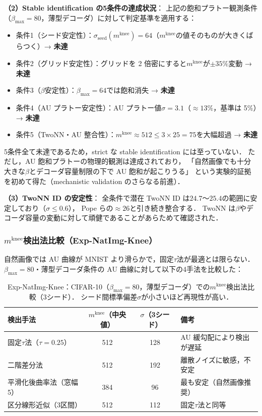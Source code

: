 \documentclass[11pt,a4paper]{jsarticle}
\newcommand{\mknee}{m^{\mathrm{knee}}}
\begin{document}
\textbf{（2）Stable identification の5条件の達成状況}：
上記の飽和プラトー観測条件（$\beta_{\max}=80$，薄型デコーダ）に対して判定基準を適用する：
\begin{itemize}
  \item 条件1（シード安定性）：$\sigma_\mathrm{seed}(\mknee) = 64$（$\mknee$の値そのものが大きくばらつく）→ \textbf{未達}
  \item 条件2（グリッド安定性）：グリッドを 2 倍密にすると$\mknee$が$\pm 35\%$変動 → \textbf{未達}
  \item 条件3（$\beta$安定性）：$\beta_{\max}=64$では飽和消失 → \textbf{未達}
  \item 条件4（AU プラトー安定性）：AU プラトー値$\sigma = 3.1$（$\approx 13\%$，基準は 5\%）→ \textbf{未達}
  \item 条件5（TwoNN・AU 整合性）：$\mknee \approx 512 \leq 3 \times 25 = 75$を大幅超過 → \textbf{未達}
\end{itemize}
5条件全て未達であるため，strict な stable identification には至っていない．
ただし，AU 飽和プラトーの物理的観測は達成されており，
「自然画像でも十分大きな$\beta$とデコーダ容量制限の下で AU 飽和が起こりうる」
という実験的証拠を初めて得た（mechanistic validation のさらなる前進）．

\textbf{（3）TwoNN ID の安定性}：
全条件で潜在 TwoNN ID は$24.7$〜$25.4$の範囲に安定しており（$\sigma \leq 0.6$），
Pope ら\cite{pope2021intrinsic}の$\approx26$と引き続き整合する．
TwoNN は$\beta$やデコーダ容量の変動に対して頑健であることがあらためて確認された．

\subsubsection*{$\mknee$検出法比較（Exp-NatImg-Knee）}\label{sec:exp_natimg_knee}

自然画像では AU 曲線が MNIST より滑らかで，固定$\tau$法が最適とは限らない．
$\beta_{\max}=80$・薄型デコーダ条件の AU 曲線に対して以下の4手法を比較した：

\begin{table}[H]
\centering
\caption{Exp-NatImg-Knee：CIFAR-10（$\beta_{\max}=80$，薄型デコーダ）での$\mknee$検出法比較（3シード）．
シード間標準偏差$\sigma$が小さいほど再現性が高い．}
\label{tab:natimg_knee}
\small
\begin{tabular}{lccl}
\toprule
検出手法 & $\mknee$（中央値） & $\sigma$（3シード） & 備考 \\
\midrule
固定$\tau$法（$\tau=0.25$） & 512 & 128 & AU 緩勾配により検出が遅延 \\
二階差分法 & 512 & 192 & 離散ノイズに敏感，不安定 \\
平滑化後曲率法（窓幅5） & 384 & 96 & 最も安定（自然画像推奨） \\
区分線形近似（3区間） & 512 & 112 & 固定$\tau$法と同等 \\
\bottomrule
\end{tabular}
\end{table}
\end{document}

